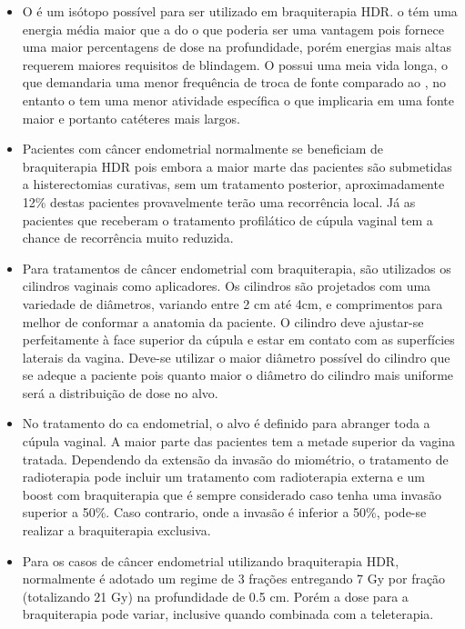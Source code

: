 \documentclass[11pt,a4paper]{article}
\newcounter{exemplo}
\begin{document}
\begin{exemplo}[8. Braquiterapia]
\begin{itemize}
        \item O  é um isótopo possível para ser utilizado em braquiterapia HDR. o  tém uma energia média maior que a do  o que poderia ser uma vantagem pois fornece uma maior percentagens de dose na profundidade, porém energias mais altas requerem maiores requisitos de blindagem. O  possui uma meia vida longa, o que demandaria uma menor frequência de troca de fonte comparado ao , no entanto o  tem uma menor atividade específica o que implicaria em uma fonte maior e portanto catéteres mais largos. 

        \item Pacientes com câncer endometrial normalmente se beneficiam de braquiterapia HDR pois embora a maior marte das pacientes são submetidas a histerectomias curativas, sem um tratamento posterior, aproximadamente 12\% destas pacientes provavelmente terão uma recorrência local. Já as pacientes que receberam o tratamento profilático de cúpula vaginal tem a chance de recorrência muito reduzida.
        
        \item Para tratamentos de câncer endometrial com braquiterapia, são utilizados os cilindros vaginais como aplicadores. Os cilindros são projetados com uma variedade de diâmetros, variando entre 2 cm até 4cm, e comprimentos para melhor de conformar a anatomia da paciente. O cilindro deve ajustar-se perfeitamente à face superior da cúpula e estar em contato com as superfícies laterais da vagina. Deve-se utilizar o maior diâmetro possível do cilindro que se adeque a paciente pois quanto maior o diâmetro do cilindro mais uniforme será a distribuição de dose no alvo.
        
        \item No tratamento do ca endometrial, o alvo é definido para abranger toda a cúpula vaginal. A maior parte das pacientes tem a metade superior da vagina tratada. Dependendo da extensão da invasão do miométrio, o tratamento de radioterapia pode incluir um tratamento com radioterapia externa e um boost com braquiterapia que é sempre considerado caso tenha uma invasão superior a 50\%. Caso contrario, onde a invasão é inferior a 50\%, pode-se realizar a braquiterapia exclusiva.
        
        \item Para os casos de câncer endometrial utilizando braquiterapia HDR, normalmente é adotado um regime de 3 frações entregando 7 Gy por fração (totalizando 21 Gy) na profundidade de 0.5 cm. Porém  a dose para a braquiterapia pode variar, inclusive quando combinada com a teleterapia.
        

\end{itemize}
\end{exemplo}
\end{document}
